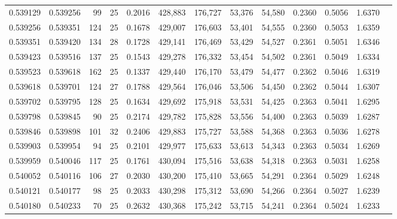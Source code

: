 \begin{tabular}{rrrrrrrrrrrrr}
0.539129 & 0.539256 &  99 &  25 &                                     0.2016 & 428,883 & 176,727 &  53,376 &  54,580 & 0.2360 & 0.5056 & 1.6370 \\
0.539256 & 0.539351 & 124 &  25 &                                     0.1678 & 429,007 & 176,603 &  53,401 &  54,555 & 0.2360 & 0.5053 & 1.6359 \\
0.539351 & 0.539420 & 134 &  28 &                                     0.1728 & 429,141 & 176,469 &  53,429 &  54,527 & 0.2361 & 0.5051 & 1.6346 \\
0.539423 & 0.539516 & 137 &  25 &                                     0.1543 & 429,278 & 176,332 &  53,454 &  54,502 & 0.2361 & 0.5049 & 1.6334 \\
0.539523 & 0.539618 & 162 &  25 &                                     0.1337 & 429,440 & 176,170 &  53,479 &  54,477 & 0.2362 & 0.5046 & 1.6319 \\
0.539618 & 0.539701 & 124 &  27 &                                     0.1788 & 429,564 & 176,046 &  53,506 &  54,450 & 0.2362 & 0.5044 & 1.6307 \\
0.539702 & 0.539795 & 128 &  25 &                                     0.1634 & 429,692 & 175,918 &  53,531 &  54,425 & 0.2363 & 0.5041 & 1.6295 \\
0.539798 & 0.539845 &  90 &  25 &                                     0.2174 & 429,782 & 175,828 &  53,556 &  54,400 & 0.2363 & 0.5039 & 1.6287 \\
0.539846 & 0.539898 & 101 &  32 &                                     0.2406 & 429,883 & 175,727 &  53,588 &  54,368 & 0.2363 & 0.5036 & 1.6278 \\
0.539903 & 0.539954 &  94 &  25 &                                     0.2101 & 429,977 & 175,633 &  53,613 &  54,343 & 0.2363 & 0.5034 & 1.6269 \\
0.539959 & 0.540046 & 117 &  25 &                                     0.1761 & 430,094 & 175,516 &  53,638 &  54,318 & 0.2363 & 0.5031 & 1.6258 \\
0.540052 & 0.540116 & 106 &  27 &                                     0.2030 & 430,200 & 175,410 &  53,665 &  54,291 & 0.2364 & 0.5029 & 1.6248 \\
0.540121 & 0.540177 &  98 &  25 &                                     0.2033 & 430,298 & 175,312 &  53,690 &  54,266 & 0.2364 & 0.5027 & 1.6239 \\
0.540180 & 0.540233 &  70 &  25 &                                     0.2632 & 430,368 & 175,242 &  53,715 &  54,241 & 0.2364 & 0.5024 & 1.6233 \\

\end{tabular}
